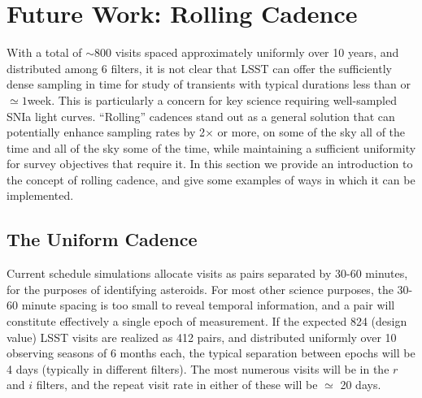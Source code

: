%
%
%

\section{Future Work: Rolling Cadence}
\def\secname{rolling}\label{sec:\secname}


With a total of $\sim 800$ visits spaced approximately uniformly over 10
years, and distributed among 6 filters, it is not clear that LSST can
offer the sufficiently dense sampling in time for study of transients
with typical durations less than or $\simeq 1$week. This is particularly
a concern for key science requiring well-sampled SNIa light curves.
``Rolling'' cadences stand out as a general solution that can
potentially enhance sampling rates by 2$\times$ or more, on some of the
sky all of the time and all of the sky some of the time, while
maintaining a sufficient uniformity for survey objectives that require
it. In this section we provide an introduction to the concept of rolling
cadence, and give some examples of ways in which it can be implemented.


\subsection{The Uniform Cadence}

Current schedule simulations allocate visits as pairs separated by 30-60
minutes, for the purposes of identifying asteroids.  For most other science
purposes, the 30-60 minute spacing is too small to reveal temporal
information, and a pair will constitute effectively a single epoch of
measurement.  If the expected 824 (design value) LSST visits are
realized as 412 pairs, and distributed uniformly over 10 observing
seasons of 6 months each, the typical separation between epochs will be
4 days (typically in different filters).   The most numerous visits will be in the $r$ and $i$
filters, and the repeat visit rate in either of these will be $\simeq$
20 days.

